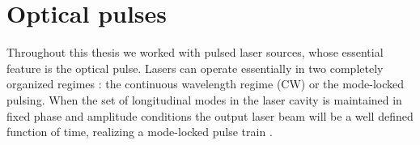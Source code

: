 \section{Optical pulses}
\label{sec:Def-Pulses}

Throughout this thesis we worked with pulsed laser sources, whose essential feature is the optical pulse.
Lasers can operate essentially in two completely organized regimes : the continuous wavelength regime (CW) or the mode-locked pulsing.
When the set of longitudinal modes in the laser cavity is maintained in fixed phase and amplitude conditions the output laser beam will be a well defined function of time, realizing a mode-locked pulse train \cite{shapiro1984}.

